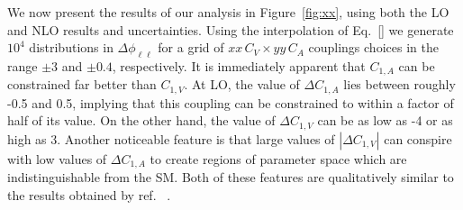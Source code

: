 \documentclass[preprint]{JHEP3} %
\def\ConeA{C_{1,A}}
\def\ConeV{C_{1,V}}
\def\DConeA{\Delta C_{1,A}}
\def\DConeV{\Delta C_{1,V}}
\begin{document}
We now present the results of our analysis in Figure~\ref{fig:xx}, using both the LO and NLO results and uncertainties.
Using the interpolation of Eq.~\ref{} we generate $10^4$ distributions in $\Delta \phi_{\ell\ell}$ for a grid of $xx \, C_V \times yy\, C_A$ couplings 
choices in the range $\pm 3$ and $\pm 0.4$, respectively. 
It is immediately apparent that $\ConeA$ can be constrained far better than $\ConeV$. 
At LO, the value of $\DConeA$ lies between roughly -0.5 and 0.5, implying that this coupling can be constrained to within a factor of half of its value. 
On the other hand, the value of $\DConeV$ can be as low as -4 or as high as 3. Another noticeable feature is that large values of $| \DConeV |$ can conspire 
with low values of $\DConeA$ to create regions of parameter space which are indistinguishable from the SM. 
Both of these features are qualitatively similar to the results obtained by ref. ~\cite{baur}. 
\end{document}
